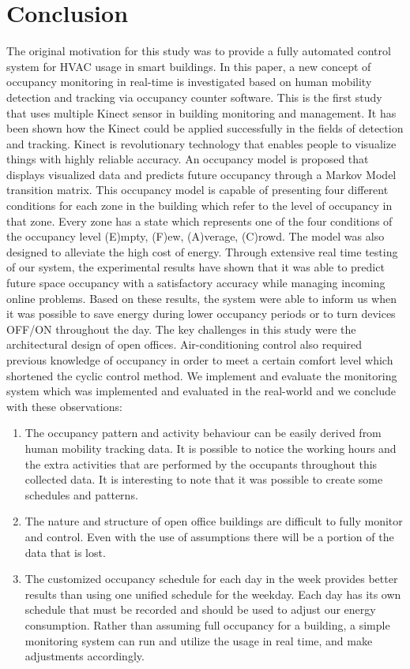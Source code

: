 \section{Conclusion}
\label{sec:conclusion}
The original motivation for this study was to provide a fully automated control system for HVAC usage in smart buildings.  In this paper, a new concept of occupancy monitoring in real-time is investigated based on human mobility detection and tracking via occupancy counter software. This is the first study that uses multiple Kinect sensor in building monitoring and management. It has been shown how the Kinect could be applied successfully in the fields of detection and tracking. Kinect is revolutionary technology that enables people to visualize things with highly reliable accuracy. An occupancy model is proposed that displays visualized data and predicts future occupancy through a Markov Model transition matrix. This occupancy model is capable of presenting four different conditions for each zone in the building which refer to the level of occupancy in that zone. Every zone has a state which represents one of the four conditions of the occupancy level {(E)mpty, (F)ew, (A)verage, (C)rowd}.  The model was also designed to alleviate the high cost of energy. Through extensive real time testing of our system, the experimental results have shown that it was able to predict future space occupancy with a satisfactory accuracy while managing incoming online problems.  Based on these results, the system were able to inform us when it was possible to save energy during lower occupancy periods or to turn devices OFF/ON throughout the day. The key challenges in this study were the architectural design of open offices.  Air-conditioning control also required previous knowledge of occupancy in order to meet a certain comfort level which shortened the cyclic control method. We implement and evaluate the monitoring system which was implemented and evaluated in the real-world and we conclude with these observations:
\begin{enumerate}
  \item The occupancy pattern and activity behaviour can be easily derived from human mobility tracking data.  It is possible to notice the working hours and the extra activities that are performed by the occupants throughout this collected data. It is interesting to note that it was possible to create some schedules and patterns.
  \item The nature and structure of open office buildings are difficult to fully monitor and control. Even with the use of assumptions there will be a portion of the data that is lost.
  \item The customized occupancy schedule for each day in the week provides better results than using one unified schedule for the weekday. Each day has its own schedule that must be recorded and should be used to adjust our energy consumption. Rather than assuming full occupancy for a building, a simple monitoring system can run and utilize the usage in real time, and make adjustments accordingly.

\end{enumerate}

